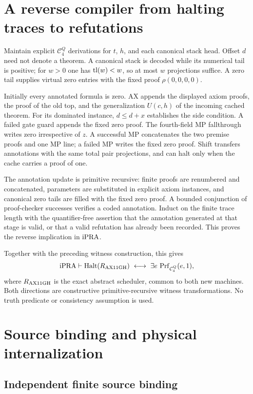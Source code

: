 \section{A reverse compiler from halting traces to refutations}
\label{sec:annotations}

Maintain explicit $\mathcal C^Q_4$ derivations for $t$, $h$, and
each canonical stack head. Offset $d$ need not denote a theorem.
A canonical stack is decoded while its numerical tail is positive;
for $w>0$ one has $\operatorname{tl}(w)<w$, so at most $w$ projections suffice.
A zero tail supplies virtual zero entries with the fixed proof
$\rho(0,0,0,0)$.

Initially every annotated formula is zero. AX appends the displayed
axiom proofs, the proof of the old top, and the generalization
$U(c,h)$ of the incoming cached theorem. For its dominated instance,
$d\le d+x$ establishes the side condition. A failed gate guard
appends the fixed zero proof. The fourth-field MP fallthrough writes
zero irrespective of $z$. A successful MP concatenates the two
premise proofs and one MP line; a failed MP writes the fixed zero
proof. Shift transfers annotations with the same total pair
projections, and can halt only when the cache carries a proof of one.

The annotation update is primitive recursive: finite proofs are
renumbered and concatenated, parameters are substituted in explicit
axiom instances, and canonical zero tails are filled with the fixed
zero proof. A bounded conjunction of proof-checker successes verifies
a coded annotation. Induct on the finite trace length with the
quantifier-free assertion that the annotation generated at that
stage is valid, or that a valid refutation has already been recorded.
This proves the reverse implication in $\mathrm{iPRA}$.

Together with the preceding witness construction, this gives
\[
 \mathrm{iPRA}\vdash
 \operatorname{Halt}(R_{\rm AX11GH})\ \longleftrightarrow\
 \exists e\,\operatorname{Prf}_{\mathcal C^Q_4}(e,1),
\]
where $R_{\rm AX11GH}$ is the exact abstract scheduler, common to
both new machines. Both directions are constructive
primitive-recursive witness transformations. No truth predicate or
consistency assumption is used.

\section{Source binding and physical internalization}
\label{sec:physical}

\subsection{Independent finite source binding}

